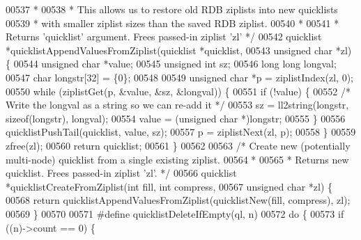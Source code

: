 \begin{DoxyCode}
{00537 \textcolor{comment}{ *}
00538 \textcolor{comment}{ * This allows us to restore old RDB ziplists into new quicklists}
00539 \textcolor{comment}{ * with smaller ziplist sizes than the saved RDB ziplist.}
00540 \textcolor{comment}{ *}
00541 \textcolor{comment}{ * Returns 'quicklist' argument. Frees passed-in ziplist 'zl' */}
00542 quicklist *quicklistAppendValuesFromZiplist(quicklist *quicklist,
00543                                             \textcolor{keywordtype}{unsigned} \textcolor{keywordtype}{char} *zl) \{
00544     \textcolor{keywordtype}{unsigned} \textcolor{keywordtype}{char} *value;
00545     \textcolor{keywordtype}{unsigned} \textcolor{keywordtype}{int} sz;
00546     \textcolor{keywordtype}{long} \textcolor{keywordtype}{long} longval;
00547     \textcolor{keywordtype}{char} longstr[32] = \{0\};
00548 
00549     \textcolor{keywordtype}{unsigned} \textcolor{keywordtype}{char} *p = ziplistIndex(zl, 0);
00550     \textcolor{keywordflow}{while} (ziplistGet(p, &value, &sz, &longval)) \{
00551         \textcolor{keywordflow}{if} (!value) \{
00552             \textcolor{comment}{/* Write the longval as a string so we can re-add it */}
00553             sz = ll2string(longstr, \textcolor{keyword}{sizeof}(longstr), longval);
00554             value = (\textcolor{keywordtype}{unsigned} \textcolor{keywordtype}{char} *)longstr;
00555         \}
00556         quicklistPushTail(quicklist, value, sz);
00557         p = ziplistNext(zl, p);
00558     \}
00559     zfree(zl);
00560     \textcolor{keywordflow}{return} quicklist;
00561 \}
00562 
00563 \textcolor{comment}{/* Create new (potentially multi-node) quicklist from a single existing ziplist.}
00564 \textcolor{comment}{ *}
00565 \textcolor{comment}{ * Returns new quicklist.  Frees passed-in ziplist 'zl'. */}
00566 quicklist *quicklistCreateFromZiplist(\textcolor{keywordtype}{int} fill, \textcolor{keywordtype}{int} compress,
00567                                       \textcolor{keywordtype}{unsigned} \textcolor{keywordtype}{char} *zl) \{
00568     \textcolor{keywordflow}{return} quicklistAppendValuesFromZiplist(quicklistNew(fill, compress), zl);
00569 \}
00570 
00571 \textcolor{preprocessor}{#}\textcolor{preprocessor}{define} \textcolor{preprocessor}{quicklistDeleteIfEmpty}\textcolor{preprocessor}{(}\textcolor{preprocessor}{ql}\textcolor{preprocessor}{,} \textcolor{preprocessor}{n}\textcolor{preprocessor}{)}
00572     \textcolor{keywordflow}{do} \textcolor{preprocessor}{\{}
00573         \textcolor{keywordflow}{if} \textcolor{preprocessor}{(}\textcolor{preprocessor}{(}\textcolor{preprocessor}{n}\textcolor{preprocessor}{)}\textcolor{preprocessor}{->}\textcolor{preprocessor}{count} \textcolor{preprocessor}{==} 0\textcolor{preprocessor}{)} \textcolor{preprocessor}{\{}
}
\end{DoxyCode}
